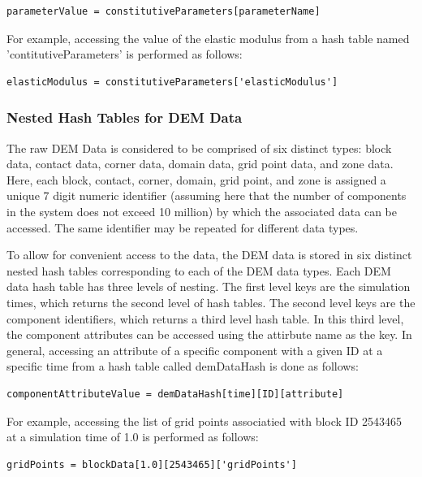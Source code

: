 \begin{lstlisting}[frame=single]
parameterValue = constitutiveParameters[parameterName]
\end{lstlisting}

For example, accessing the value of the elastic modulus from a hash table named 'contitutiveParameters' is performed as follows:

\begin{lstlisting}[frame=single]
elasticModulus = constitutiveParameters['elasticModulus']
\end{lstlisting}

\subsubsection*{Nested Hash Tables for DEM Data}
The raw DEM Data is considered to be comprised of six distinct types: block data, contact data, corner data, domain data, grid point data, and zone data. Here, each block, contact, corner, domain, grid point, and zone is assigned a unique 7 digit numeric identifier (assuming here that the number of components in the system does not exceed 10 million) by which the associated data can be accessed. The same identifier may be repeated for different data types.

To allow for convenient access to the data, the DEM data is stored in six distinct nested hash tables corresponding to each of the DEM data types.  Each DEM data hash table has three levels of nesting. The first level keys are the simulation times, which returns the second level of hash tables. The second level keys are the component identifiers, which returns a third level hash table. In this third level, the component attributes can be accessed using the attirbute name as the key. In general, accessing an attribute of a specific component with a given ID at a specific time from a hash table called demDataHash is done as follows:


\begin{lstlisting}[frame=single]
componentAttributeValue = demDataHash[time][ID][attribute]
\end{lstlisting}

For example, accessing the list of grid points associatied with block ID 2543465 at a simulation time of 1.0 is performed as follows:

\begin{lstlisting}[frame=single]
gridPoints = blockData[1.0][2543465]['gridPoints']
\end{lstlisting}

